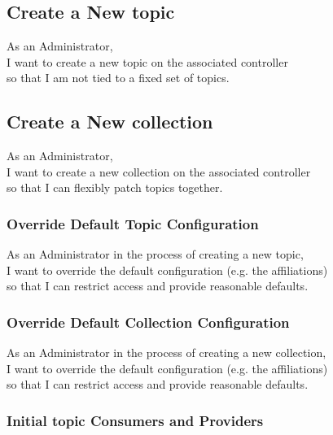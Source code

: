 \subsection{Create a New topic}\label{sec:create-topic}

As an Administrator,\\
I want to create a new topic on the associated controller\\
so that I am not tied to a fixed set of topics.

\subsection{Create a New collection}\label{sec:create-collection}

As an Administrator,\\
I want to create a new collection on the associated controller\\
so that I can flexibly patch topics together.

\subsubsection{Override Default Topic Configuration}\label{sec:requirement-topic-default-configuration}

As an Administrator in the process of creating a new topic,\\
I want to override the default configuration (e.g. the affiliations) \\
so that I can restrict access and provide reasonable defaults.

\subsubsection{Override Default Collection Configuration}\label{sec:requirement-collection-default-configuration}

As an Administrator in the process of creating a new collection,\\
I want to override the default configuration (e.g. the affiliations) \\
so that I can restrict access and provide reasonable defaults.

\subsubsection{Initial topic Consumers and Providers}\label{sec:requirement-initial-topic-consumer-provider}

